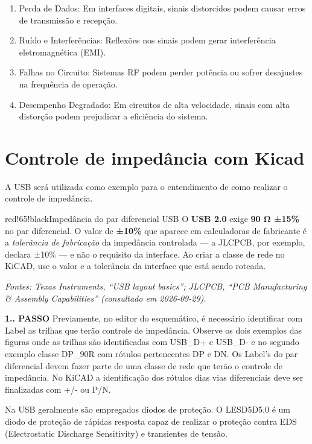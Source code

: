 \begin{enumerate}
\def\labelenumi{\arabic{enumi}.}
\tightlist
\item
  Perda de Dados: Em interfaces digitais, sinais distorcidos podem causar erros de transmissão e recepção.
\item
  Ruído e Interferências: Reflexões nos sinais podem gerar interferência eletromagnética (EMI).
\item
  Falhas no Circuito: Sistemas RF podem perder potência ou sofrer desajustes na frequência de operação.
\item
  Desempenho Degradado: Em circuitos de alta velocidade, sinais com alta distorção podem prejudicar a eficiência do sistema.
\end{enumerate}

\hypertarget{controle-de-impeduxe2ncia-com-kicad}{%
\section{Controle de impedância com Kicad}\label{controle-de-impeduxe2ncia-com-kicad}}

A USB será utilizada como exemplo para o entendimento de como realizar o controle de impedância.

\begin{quadro}{red!65!black}{Impedância do par diferencial USB}
O \textbf{USB 2.0} exige \textbf{90 Ω ±15\%} no par diferencial. O valor
de \textbf{±10\%} que aparece em calculadoras de fabricante é a
\emph{tolerância de fabricação} da impedância controlada --- a JLCPCB,
por exemplo, declara ±10\% --- e não o requisito da interface. Ao criar
a classe de rede no KiCAD, use o valor e a tolerância da interface que
está sendo roteada.

\emph{Fontes: Texas Instruments, ``USB layout basics''; JLCPCB, ``PCB
Manufacturing \& Assembly Capabilities'' (consultado em 2026-09-29).}
\end{quadro}

\textbf{1.. PASSO} Previamente, no editor do esquemático, é necessário identificar com Label as trilhas que terão controle de impedância. Observe os dois exemplos das figuras onde as trilhas são identificadas com USB\_D+ e USB\_D- e no segundo exemplo classe DP\_90R com rótulos pertencentes DP e DN. Os Label's do par diferencial devem fazer parte de uma classe de rede que terão o controle de impedância. No KiCAD a identificação dos rótulos dias vias diferenciais deve ser finalizadas com +/- ou P/N.

Na USB geralmente são empregados diodos de proteção. O LESD5D5.0 é um diodo de proteção de rápidas resposta capaz de realizar o proteção contra EDS (Electrostatic Discharge Sensitivity) e transientes de tensão.

